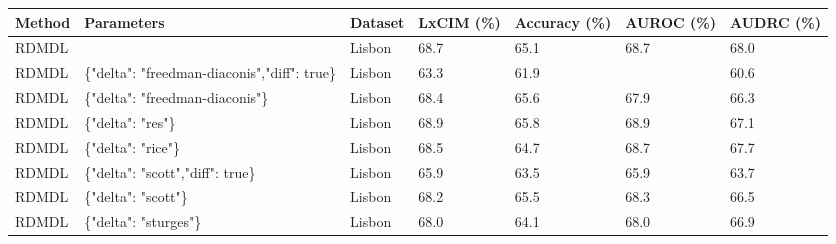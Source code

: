 \begin{tabular}{lllllll}
\toprule
Method & Parameters & Dataset & LxCIM (\%) & Accuracy (\%) & AUROC (\%) & AUDRC (\%) \\
\midrule
RDMDL &  & Lisbon & 68.7 & 65.1 & 68.7 & 68.0 \\
RDMDL & \{"delta": "freedman-diaconis","diff": true\} & Lisbon & 63.3 & 61.9 &  & 60.6 \\
RDMDL & \{"delta": "freedman-diaconis"\} & Lisbon & 68.4 & 65.6 & 67.9 & 66.3 \\
RDMDL & \{"delta": "res"\} & Lisbon & 68.9 & 65.8 & 68.9 & 67.1 \\
RDMDL & \{"delta": "rice"\} & Lisbon & 68.5 & 64.7 & 68.7 & 67.7 \\
RDMDL & \{"delta": "scott","diff": true\} & Lisbon & 65.9 & 63.5 & 65.9 & 63.7 \\
RDMDL & \{"delta": "scott"\} & Lisbon & 68.2 & 65.5 & 68.3 & 66.5 \\
RDMDL & \{"delta": "sturges"\} & Lisbon & 68.0 & 64.1 & 68.0 & 66.9 \\
\bottomrule
\end{tabular}
